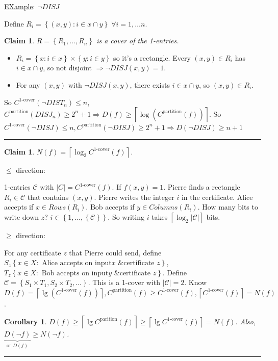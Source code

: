 \documentclass[twoside]{article}
\newtheorem{claim}[theorem]{Claim}
\newtheorem{corollary}[theorem]{Corollary}
\newenvironment{proof}{{\bf Proof:}}{\hfill\rule{2mm}{2mm}}
\newcommand{\C}{\mathcal{C}}
\newcommand{\set}[1]{\left \{ #1 \right \}}
\newcommand{\abs}[1]{\left | #1 \right |}
\newcommand{\ceil}[1]{\left \lceil #1 \right \rceil }
\begin{document}
\underline{EXample}: $\neg DISJ$

Define $R_i = \set{(x, y): i \in x \cap y} \; \forall i = 1, \ldots n$.

\begin{claim}
    $R = \set{R_1, \ldots, R_n}$ is a cover of the 1-entries.
\end{claim}

\begin{proof}
    \begin{itemize}
        \item $R_i = \set{x: i \in x} \times \set{y: i \in y}$ so it's a rectangle. Every $(x, y) \in R_i$ has $i \in x \cap y$, so not disjoint $\Rightarrow \neg DISJ(x, y) = 1$.
        \item For any $(x, y)$ with $\neg DISJ(x, y)$, there exists $i \in x \cap y$, so $(x, y) \in R_i$.
    \end{itemize}

    So $C^{\text{1-cover}}(\neg DIST_n) \leq n$, $C^{\text{partition}}(DISJ_n) \geq 2^n + 1 \Rightarrow D(f) \geq \ceil{\log(C^{\text{partition}}(f))}$. So $C^{\text{1-cover}}(\neg DISJ) \leq n, C^{\text{partition}}(\neg DISJ) \geq 2^n + 1 \Rightarrow D(\neg DISJ) \geq n + 1$
\end{proof}

\begin{claim}
    $N(f) = \ceil{\log_2{C^{\text{1-cover}}(f)}}$.
\end{claim}

\begin{proof}

    $\leq$ direction:

    1-entries $\C$ with $\abs{C} = C^{\text{1-cover}}(f)$. If $f(x, y) = 1$. Pierre finds a rectangle $R_i \in \C$ that contains $(x, y)$. Pierre writes the integer $i$ in the certificate. Alice accepts if $x \in Rows(R_i)$. Bob accepts if $y \in Columns(R_i)$. How many bits to write down $z$? $i \in \set{1, \ldots, \set{\C}}$. So writing $i$ takes $\ceil{\log_2{\abs{\C}}}$ bits.

    $\geq$ direction:

    For any certificate $z$ that Pierre could send, define $S_z \set{ x \in X: \text{ Alice accepts on input} x \text{ \& certificate } z}$, $T_z \set{ x \in X: \text{ Bob accepts on input} y \text{ \& certificate } z}$. Define $\C = \set{S_1 \times T_1, S_2 \times T_2, \ldots}$. This is a 1-cover with $\abs{\C} = 2$. Know $D(f) = \ceil{\lg(C^{\text{1-cover}}(f))}, C^{\text{partition}}(f) \geq C^{\text{1-cover}}(f), \ceil{C^{\text{1-cover}}(f)} = N(f)$.

    \begin{corollary}
        $D(f) \geq \ceil{\lg{C^{\text{parition}}}(f)} \geq \ceil{\lg{C^{\text{1-cover}}}(f)} = N(f)$. Also, $\underbrace{D(\neg f)}_{\text{or } D(f)} \geq N(\neg f)$.
    \end{corollary}
\end{proof}
\end{document}
